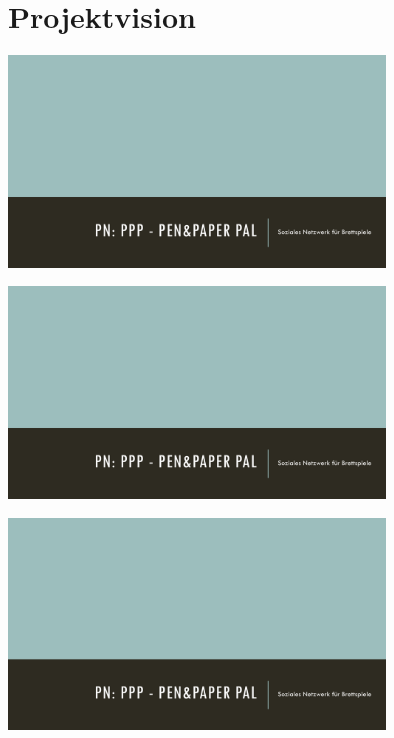 \documentclass[DIV=13, 10pt,a4paper]{scrartcl}
\begin{document}
\section{Projektvision}
\thispagestyle{empty}
	\begin{flushleft}
		\includegraphics[page=1,width=0.75\textwidth]{docs/0_Sonstiges/presentation.pdf}
		\vfill
	\end{flushleft}
	\begin{center}
		\includegraphics[page=2,width=0.75\textwidth]{docs/0_Sonstiges/presentation.pdf}
		\vfill
	\end{center}
	\begin{flushright}
		\includegraphics[page=3,width=0.75\textwidth]{docs/0_Sonstiges/presentation.pdf}
	\end{flushright}
	
\end{document}
